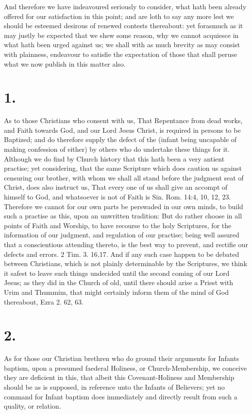 \documentclass[12pt,a4paper]{book}
\begin{document}
And therefore we have indeavoured seriously to consider, what hath been already offered for our satisfaction in this point; and are loth to say any more lest we should be esteemed desirous of renewed contests thereabout: yet forasmuch as it may justly be expected that we shew some reason, why we cannot acquiesce in what hath been urged against us; we shall with as much brevity as may consist with plainness, endeavour to satisfie the expectation of those that shall peruse what we now publish in this matter also.

\section*{1.}
As to those Christians who consent with us, That Repentance from dead works, and Faith towards God, and our Lord Jesus Christ, is required in persons to be Baptized; and do therefore supply the defect of the (infant being uncapable of making confession of either) by others who do undertake these things for it. Although we do find by Church history that this hath been a very antient practise; yet considering, that the same Scripture which does caution us against censuring our brother, with whom we shall all stand before the judgment seat of Christ, does also instruct us, That every one of us shall give an accompt of himself to God, and whatsoever is not of Faith is Sin. Rom. 14:4, 10, 12, 23. Therefore we cannot for our own parts be perswaded in our own minds, to build such a practise as this, upon an unwritten tradition: But do rather choose in all points of Faith and Worship, to have recourse to the holy Scriptures, for the information of our judgment, and regulation of our practise; being well assured that a conscientious attending thereto, is the best way to prevent, and rectifie our defects and errors. 2 Tim. 3. 16,17. And if any such case happen to be debated between Christians, which is not plainly determinable by the Scriptures, we think it safest to leave such things undecided until the second coming of our Lord Jesus; as they did in the Church of old, until there should arise a Priest with Urim and Thummim, that might certainly inform them of the mind of God thereabout, Ezra 2. 62, 63.

\section*{2.}
As for those our Christian brethren who do ground their arguments for Infants baptism, upon a presumed faederal Holiness, or Church-Membership, we conceive they are deficient in this, that albeit this Covenant-Holiness and Membership should be as is supposed, in reference unto the Infants of Believers; yet no command for Infant baptism does immediately and directly result from such a quality, or relation.
\end{document}
